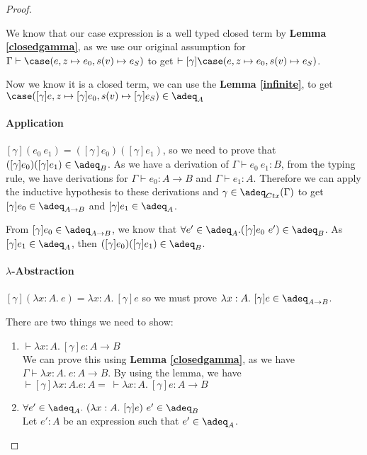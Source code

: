 \begin{proof}
\begin{enumerate}
{We know that our case expression is a well typed closed term by \textbf{Lemma \ref{closedgamma}}, as we use our original assumption for $\Gamma \vdash \case(e, z \mapsto e_0, s(v) \mapsto e_S)$ to get $\vdash [\gamma]\case(e, z \mapsto e_0, s(v) \mapsto e_S)$.

Now we know it is a closed term,  we can use the \textbf{Lemma \ref{infinite}}, to get $\case([\gamma]e, z \mapsto [\gamma]e_0, s(v) \mapsto [\gamma]e_S) \in \adeq_A$
}
\end{enumerate}

\paragraph{Application} $[\gamma](e_0 \ e_1) = ([\gamma] e_0) ([\gamma] e_1)$, so we need to prove that $([\gamma] e_0) ([\gamma] e_1) \in \adeq_B$. As we have a derivation of $\Gamma \vdash e_0 \ e_1 : B$, from the typing rule, we have derivations for $\Gamma \vdash e_0 : A \to B$ and $\Gamma \vdash e_1 : A$. Therefore we can apply the inductive hypothesis to these derivations and $\gamma \in \adeq_{Ctx}(\Gamma)$ to get $[\gamma]e_0 \in \adeq_{A \to B}$ and $[\gamma]e_1 \in \adeq_A$. 

From $[\gamma]e_0 \in \adeq_{A \to B}$, we know that $\forall e' \in \adeq_A. ([\gamma]e_0 \ e') \in \adeq_B$. As $[\gamma]e_1 \in \adeq_A$, then $([\gamma]e_0)([\gamma]e_1) \in \adeq_B$.

\paragraph{$\lambda$-Abstraction} $[\gamma] (\lambda x:A. \ e) = \lambda x:A. \ [\gamma] e$ so we must prove $\lambda x:A. \ [\gamma] e \in \adeq_{A \to B}$.  

There are two things we need to show:

\begin{enumerate}
\item{$\vdash \lambda x:A. \ [\gamma] e : A \to B$ \\ 
We can prove this using \textbf{Lemma \ref{closedgamma}}, as we have $\Gamma \vdash \lambda x : A . \ e : A \to B$. By using the lemma, we have $\vdash [\gamma]\lambda x : A . e : A = \ \vdash \lambda x : A . \ [\gamma] e : A \to B$}

\item{$\forall e' \in \adeq_A. \ (\lambda x:A. \ [\gamma]e) \ e' \in \adeq_B$ \\
Let $e':A$ be an expression such that $e' \in \adeq_A$. 

}
\end{enumerate}
\end{proof}
